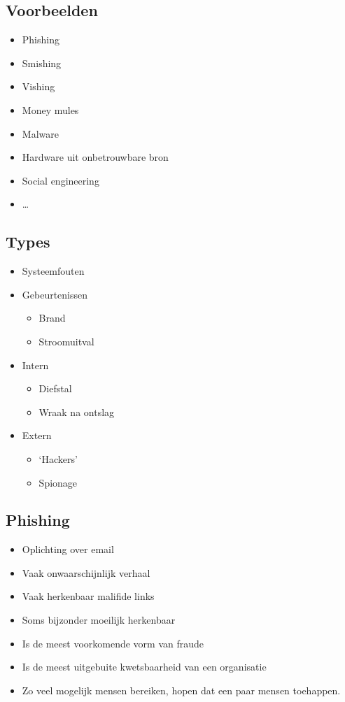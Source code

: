 \documentclass{article}
\begin{document}
\subsection{Voorbeelden}

\begin{itemize}
    \item Phishing
    \item Smishing
    \item Vishing
    \item Money mules
    \item Malware
    \item Hardware uit onbetrouwbare bron
    \item Social engineering
    \item \dots
\end{itemize}

\subsection{Types}

\begin{itemize}
    \item Systeemfouten
    \item Gebeurtenissen
    \begin{itemize}
        \item Brand
        \item Stroomuitval
    \end{itemize}
    \item Intern
    \begin{itemize}
        \item Diefstal
        \item Wraak na ontslag
    \end{itemize}
    \item Extern
    \begin{itemize}
        \item `Hackers'
        \item Spionage
    \end{itemize}
\end{itemize}

\subsection{Phishing}

\begin{itemize}
    \item Oplichting over email
    \item Vaak onwaarschijnlijk verhaal
    \item Vaak herkenbaar malifide links
    \item Soms bijzonder moeilijk herkenbaar
    \item Is de meest voorkomende vorm van fraude
    \item Is de meest uitgebuite kwetsbaarheid van een organisatie
    \item Zo veel mogelijk mensen bereiken, hopen dat een paar mensen toehappen.
\end{itemize}
\end{document}
